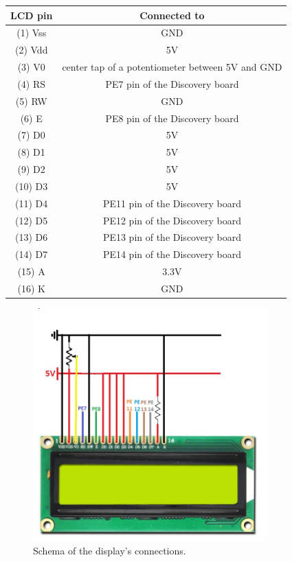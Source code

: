 \begin{tabular}{|c|c|}
	\hline 
	\textbf{LCD pin} & \textbf{Connected to} \\ 
	\hline 
	(1) Vss & GND \\ 
	\hline 
	(2) Vdd & 5V \\ 
	\hline 
	(3) V0 & center tap of a potentiometer between 5V and GND \\ 
	\hline 
	(4) RS & PE7 pin of the Discovery board \\ 
	\hline 
	(5) RW & GND \\ 
	\hline 
	(6) E & PE8 pin of the Discovery board \\ 
	\hline 
	(7) D0 & 5V \\ 
	\hline 
	(8) D1 & 5V \\ 
	\hline 
	(9) D2 & 5V \\ 
	\hline 
	(10) D3 & 5V \\ 
	\hline 
	(11) D4 & PE11 pin of the Discovery board \\ 
	\hline 
	(12) D5 & PE12 pin of the Discovery board \\ 
	\hline 
	(13) D6 & PE13 pin of the Discovery board \\ 
	\hline 
	(14) D7 & PE14 pin of the Discovery board \\ 
	\hline 
	(15) A & 3.3V \\ 
	\hline 
	(16) K & GND \\ 
	\hline 
\end{tabular} 

\begin{figure}[H]
	\centering
	\hspace*{0.1 \textwidth}\includegraphics[width= 0.8\textwidth]
	{files/images/display_connections.jpg}
	\caption{Schema of the display's connections.}
\end{figure}


